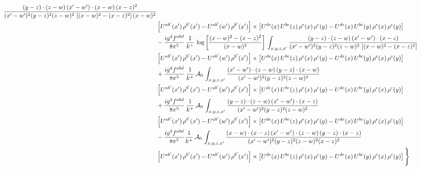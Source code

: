 \documentclass[10pt]{article}
\numberwithin{equation}{section}
\begin{document}
\begin{align}
\frac{(y-z)\cdot(z-w)\,(x'-w')\cdot(x-w)\,(x-z)^{2}}{(x'-w')^{2}(y-z)^{2}(z-w)^{2}\,\left[(x-w)^{2}-(x-z)^{2}\right](x-w)^{2}}\notag \\ 
& \left[U^{ab'}(x')\,\rho^{b'}(x')-U^{ab'}(w')\, \rho^{b'}(x')\right]\times \left[U^{de}(x)\,U^{bc}(z)\, \rho^{e}(x)\,\rho^{c}(y)-U^{de}(x)\,U^{bc}(y)\,\rho^{e}(x)\,\rho^{c}(y)\right] \notag \\
& -\frac{ig^{4}f^{abd}}{8\pi^{5}}\,\frac{1}{k^{+}}\,\log{\left[\frac{(x-w)^{2}-(x-z)^{2}}{(x-w)^{2}}\right]}\,\int_{x,y,z,x'}
\frac{(y-z)\cdot(z-w)\,(x'-w')\cdot(x-z)}{(x'-w')^{2}(y-z)^{2}(z-w)^{2}\,\left[(x-w)^{2}-(x-z)^{2}\right]}\notag \\ & \left[U^{ab'}(x')\,\rho^{b'}(x')-U^{ab'}(w')\, \rho^{b'}(x')\right]\times \left[U^{de}(x)\,U^{bc}(z)\, \rho^{e}(x)\,\rho^{c}(y)-U^{de}(x)\,U^{bc}(y)\,\rho^{e}(x)\,\rho^{c}(y)\right] \notag \\
& +\frac{ig^{4}f^{abd}}{8\pi^{5}}\,\frac{1}{k^{+}}\,\mathcal{A}_{0}\,\int_{x,y,z,x'}
\frac{(x'-w')\cdot(z-w)\,(y-z)\cdot(x-w)}{(x'-w')^{2}(y-z)^{2}(z-w)^{2}}\notag \\
& \left[U^{ab'}(x')\,\rho^{b'}(x')-U^{ab'}(w')\, \rho^{b'}(x')\right]\times \left[U^{de}(x)\,U^{bc}(z)\, \rho^{e}(x)\,\rho^{c}(y)-U^{de}(x)\,U^{bc}(y)\,\rho^{e}(x)\,\rho^{c}(y)\right] \notag \\
& +\frac{ig^{4}f^{abd}}{8\pi^{5}}\,\frac{1}{k^{+}}\,\mathcal{A}_{0}\,\int_{x,y,z,x'}
\frac{(y-z)\cdot(z-w)\,(x'-w')\cdot(x-z)}{(x'-w')^{2}(y-z)^{2}(z-w)^{2}}\notag \\ & \left[U^{ab'}(x')\,\rho^{b'}(x')-U^{ab'}(w')\, \rho^{b'}(x')\right]\times \left[U^{de}(x)\,U^{bc}(z)\, \rho^{e}(x)\,\rho^{c}(y)-U^{de}(x)\,U^{bc}(y)\,\rho^{e}(x)\,\rho^{c}(y)\right] \notag \\
& -\frac{ig^{4}f^{abd}}{8\pi^{5}}\frac{1}{k^{+}}\,\mathcal{A}_{0}\,\int_{x,y,z,x'}
\frac{(x-w)\cdot(x-z)\,(x'-w')\cdot(z-w)\,(y-z)\cdot(x-z)}{(x'-w')^{2}(y-z)^{2}(z-w)^{2}(x-z)^{2}}\notag \\ & \left[U^{ab'}(x')\,\rho^{b'}(x')-U^{ab'}(w')\, \rho^{b'}(x')\right]\times \left[U^{de}(x)\,U^{bc}(z)\, \rho^{e}(x)\,\rho^{c}(y)-U^{de}(x)\,U^{bc}(y)\,\rho^{e}(x)\,\rho^{c}(y)\right]\Bigg\} \label{eq:R:G1IIIN3a}
\end{align}
\end{document}
